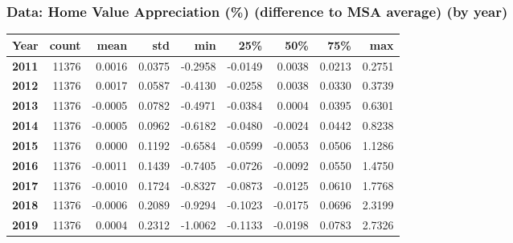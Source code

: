 \documentclass[aspectratio=169]{beamer}
\newcommand {\framedgraphic}[2] {
    \begin{frame}{#1}
        \begin{center}
            \texttt{[image: \#2]}
        \end{center}
    \end{frame}
}
\begin{document}
\begin{frame}
    \frametitle{Data: Home Value Appreciation (\%) (difference to MSA average) (by year)}
        \centering
        \begin{tabular}{lrrrrrrrr}
            \toprule
            Year & count & mean & std & min & 25\% & 50\% & 75\% & max \\
            \midrule
            \textbf{2011} & 11376 & 0.0016 & 0.0375 & -0.2958 & -0.0149 & 0.0038 & 0.0213 & 0.2751 \\
            \textbf{2012} & 11376 & 0.0017 & 0.0587 & -0.4130 & -0.0258 & 0.0038 & 0.0330 & 0.3739 \\
            \textbf{2013} & 11376 & -0.0005 & 0.0782 & -0.4971 & -0.0384 & 0.0004 & 0.0395 & 0.6301 \\
            \textbf{2014} & 11376 & -0.0005 & 0.0962 & -0.6182 & -0.0480 & -0.0024 & 0.0442 & 0.8238 \\
            \textbf{2015} & 11376 & 0.0000 & 0.1192 & -0.6584 & -0.0599 & -0.0053 & 0.0506 & 1.1286 \\
            \textbf{2016} & 11376 & -0.0011 & 0.1439 & -0.7405 & -0.0726 & -0.0092 & 0.0550 & 1.4750 \\
            \textbf{2017} & 11376 & -0.0010 & 0.1724 & -0.8327 & -0.0873 & -0.0125 & 0.0610 & 1.7768 \\
            \textbf{2018} & 11376 & -0.0006 & 0.2089 & -0.9294 & -0.1023 & -0.0175 & 0.0696 & 2.3199 \\
            \textbf{2019} & 11376 & 0.0004 & 0.2312 & -1.0062 & -0.1133 & -0.0198 & 0.0783 & 2.7326 \\
            \bottomrule
        \end{tabular}
\end{frame}
\end{document}
